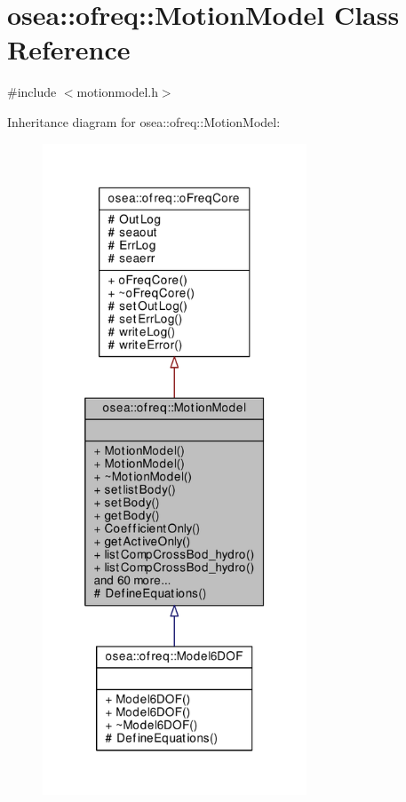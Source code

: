 \hypertarget{classosea_1_1ofreq_1_1_motion_model}{\section{osea\-:\-:ofreq\-:\-:Motion\-Model Class Reference}
\label{classosea_1_1ofreq_1_1_motion_model}
}


{\ttfamily \#include $<$motionmodel.\-h$>$}



Inheritance diagram for osea\-:\-:ofreq\-:\-:Motion\-Model\-:\nopagebreak
\begin{figure}[H]
\begin{center}
\leavevmode
\includegraphics[height=550pt]{classosea_1_1ofreq_1_1_motion_model__inherit__graph}
\end{center}
\end{figure}
